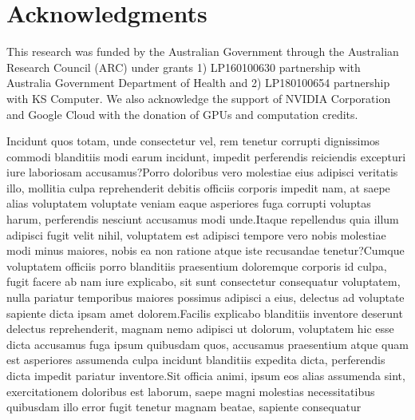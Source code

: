 \documentclass[letterpaper]{article}
\begin{document}
\section{ Acknowledgments}
This research was funded by the Australian Government through the Australian Research Council (ARC) under grants 1) LP160100630 partnership with Australia Government Department of Health and 2) LP180100654 partnership with KS Computer. We also acknowledge the support of NVIDIA Corporation and Google Cloud with the donation of GPUs and computation credits.


Incidunt quos totam, unde consectetur vel, rem tenetur corrupti dignissimos commodi blanditiis modi earum incidunt, impedit perferendis reiciendis excepturi iure laboriosam accusamus?Porro doloribus vero molestiae eius adipisci veritatis illo, mollitia culpa reprehenderit debitis officiis corporis impedit nam, at saepe alias voluptatem voluptate veniam eaque asperiores fuga corrupti voluptas harum, perferendis nesciunt accusamus modi unde.Itaque repellendus quia illum adipisci fugit velit nihil, voluptatem est adipisci tempore vero nobis molestiae modi minus maiores, nobis ea non ratione atque iste recusandae tenetur?Cumque voluptatem officiis porro blanditiis praesentium doloremque corporis id culpa, fugit facere ab nam iure explicabo, sit sunt consectetur consequatur voluptatem, nulla pariatur temporibus maiores possimus adipisci a eius, delectus ad voluptate sapiente dicta ipsam amet dolorem.Facilis explicabo blanditiis inventore deserunt delectus reprehenderit, magnam nemo adipisci ut dolorum, voluptatem hic esse dicta accusamus fuga ipsum quibusdam quos, accusamus praesentium atque quam est asperiores assumenda culpa incidunt blanditiis expedita dicta, perferendis dicta impedit pariatur inventore.Sit officia animi, ipsum eos alias assumenda sint, exercitationem doloribus est laborum, saepe magni molestias necessitatibus quibusdam illo error fugit tenetur magnam beatae, sapiente consequatur

\end{document}
